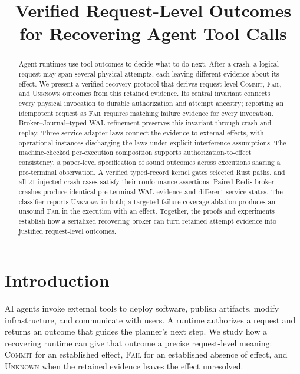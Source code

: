 \documentclass[acmsmall,screen,review,anonymous]{acmart}
\title[Verified Request-Level Outcomes]{Verified Request-Level Outcomes for Recovering Agent Tool Calls}
\newcommand{\Unknown}{\textsc{Unknown}\xspace}
\newcommand{\Commit}{\textsc{Commit}\xspace}
\newcommand{\Fail}{\textsc{Fail}\xspace}
\begin{document}
\begin{abstract}
Agent runtimes use tool outcomes to decide what to do next. After a crash,
a logical request may span several physical attempts, each leaving different
evidence about its effect. We present a verified recovery protocol that
derives request-level \Commit, \Fail, and \Unknown outcomes from this
retained evidence. Its central invariant connects every physical invocation
to durable authorization and attempt ancestry; reporting an idempotent
request as \Fail requires matching failure evidence for every invocation.
Broker--Journal--typed-WAL refinement preserves this invariant through crash
and replay. Three service-adapter laws connect the evidence to external
effects, with operational instances discharging the laws under explicit
interference assumptions. The machine-checked per-execution composition
supports authorization-to-effect consistency, a paper-level specification
of sound outcomes across executions sharing a pre-terminal observation.
A verified typed-record kernel gates selected Rust paths, and all 21
injected-crash cases satisfy their conformance assertions. Paired Redis
broker crashes produce identical pre-terminal WAL evidence and different
service states. The classifier reports \Unknown in both; a targeted
failure-coverage ablation produces an unsound \Fail in the execution with an effect.
Together, the proofs and experiments establish how a serialized recovering
broker can turn retained attempt evidence into justified request-level outcomes.
\end{abstract}


\maketitle
\section{Introduction}
\label{sec:introduction}

AI agents invoke external tools to deploy software, publish artifacts, modify
infrastructure, and communicate with users. A runtime authorizes a request
and returns an outcome that guides the
planner's next step. We study how a recovering runtime can give that
outcome a precise request-level meaning: \Commit
for an established effect, \Fail for an established absence of effect, and
\Unknown when the retained evidence leaves the effect unresolved.
\end{document}
